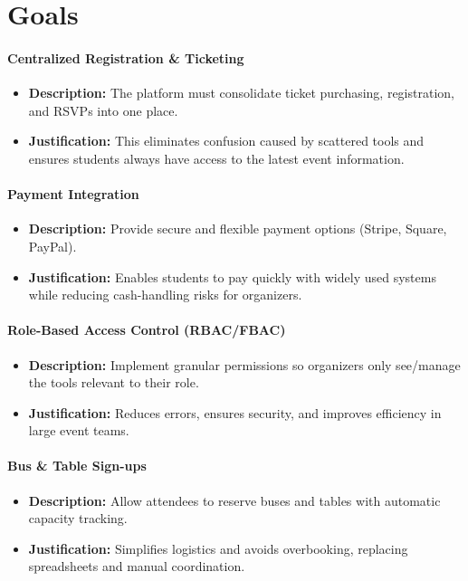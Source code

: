 \documentclass{article}
\begin{document}
\section{Goals}


\paragraph{Centralized Registration \& Ticketing}
\begin{itemize}
    \item \textbf{Description:} The platform must consolidate ticket purchasing, registration, and RSVPs into one place.
    \item \textbf{Justification:} This eliminates confusion caused by scattered tools and ensures students always have access to the latest event information.
\end{itemize}

\paragraph{Payment Integration}
\begin{itemize}
    \item \textbf{Description:} Provide secure and flexible payment options (Stripe, Square, PayPal).
    \item \textbf{Justification:} Enables students to pay quickly with widely used systems while reducing cash-handling risks for organizers.
\end{itemize}

\paragraph{Role-Based Access Control (RBAC/FBAC)}
\begin{itemize}
    \item \textbf{Description:} Implement granular permissions so organizers only see/manage the tools relevant to their role.
    \item \textbf{Justification:} Reduces errors, ensures security, and improves efficiency in large event teams.
\end{itemize}

\paragraph{Bus \& Table Sign-ups}
\begin{itemize}
    \item \textbf{Description:} Allow attendees to reserve buses and tables with automatic capacity tracking.
    \item \textbf{Justification:} Simplifies logistics and avoids overbooking, replacing spreadsheets and manual coordination.
\end{itemize}
\end{document}

